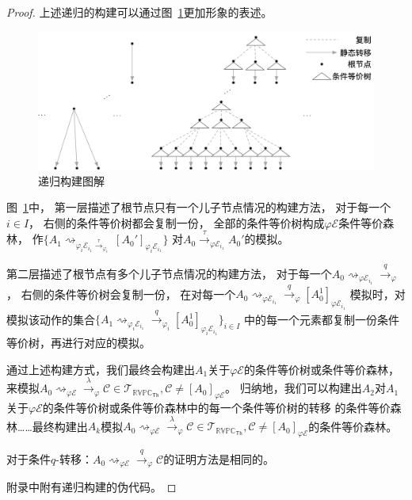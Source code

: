 \begin{proof}
   上述递归的构建可以通过图~\ref{fig:equal_forest}更加形象的表述。
   \begin{figure}[!htbp]
      \small
      \centering
      \includegraphics[width=13cm]{../figure/equality_1.png}
      \caption[]{递归构建图解} 
      \label{fig:equal_forest}
   \end{figure}
   图~\ref{fig:equal_forest}中，
   第一层描述了根节点只有一个儿子节点情况的构建方法，
   对于每一个$i\in I$，
   右侧的条件等价树都会复制一份，
   全部的条件等价树构成$\varphi\mathcal{E}$条件等价森林，
   作$\{A_1\rightsquigarrow_{\varphi_i\mathcal{E}_{i_1}\stackrel{\tau}{\rightarrow}_{\varphi_i}}[A_0']_{\varphi_i\mathcal{E}_{i_1}}\}$
   对$A_0\stackrel{\tau}{\rightarrow}_{\varphi\mathcal{E}_{i_1}}A_0'$的模拟。

   第二层描述了根节点有多个儿子节点情况的构建方法，
   对于每一个$A_0\rightsquigarrow_{\varphi\mathcal{E}_{i_1}}\stackrel{q}{\rightarrow}_{\varphi}$，
   右侧的条件等价树会复制一份，
   在对每一个$A_0\rightsquigarrow_{\varphi\mathcal{E}_{i_1}}\stackrel{q}{\rightarrow}_{\varphi} [A_0^1]_{\varphi\mathcal{E}_{i_1}}$
   模拟时，对模拟该动作的集合$\{A_1\rightsquigarrow_{\varphi_i\mathcal{E}_{i_1}}\stackrel{q}{\rightarrow}_{\varphi_i} [A_0^1]_{\varphi_i\mathcal{E}_{i_1}}\}_{i\in I}$
   中的每一个元素都复制一份条件等价树，再进行对应的模拟。

   通过上述构建方式，我们最终会构建出$A_1$关于$\varphi\mathcal{E}$的条件等价树或条件等价森林，
   来模拟$A_0\rightsquigarrow_{\varphi\mathcal{E}}\stackrel{\lambda}{\rightarrow}_{\varphi} \mathcal{C}\in \mathcal{T}_{\mathbb{RVPC}_{\mathsf{Th}}},\mathcal{C}\neq [A_0]_{\varphi\mathcal{E}}$。
   归纳地，我们可以构建出$A_2$对$A_1$关于$\varphi\mathcal{E}$的条件等价树或条件等价森林中的每一个条件等价树的转移
   的条件等价森林……最终构建出$A_k$模拟$A_0\rightsquigarrow_{\varphi\mathcal{E}}\stackrel{\lambda}{\rightarrow}_{\varphi} \mathcal{C}\in \mathcal{T}_{\mathbb{RVPC}_{\mathsf{Th}}},\mathcal{C}\neq [A_0]_{\varphi\mathcal{E}}$的条件等价森林。

   对于条件$q$-转移：$A_0\rightsquigarrow_{\varphi\mathcal{E}}\stackrel{q}{\rightarrow}_{\varphi}\mathcal{C}$的证明方法是相同的。

   附录中附有递归构建的伪代码。
\end{proof}

